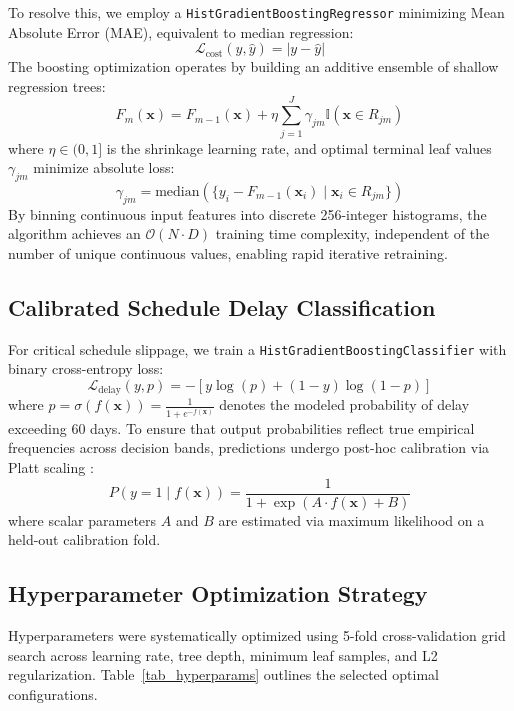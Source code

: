 \documentclass[conference]{IEEEtran}
\begin{document}
To resolve this, we employ a \texttt{HistGradientBoostingRegressor} minimizing Mean Absolute Error (MAE), equivalent to median regression:
\begin{equation}
\mathcal{L}_{\text{cost}}(y, \hat{y}) = |y - \hat{y}|
\end{equation}
The boosting optimization operates by building an additive ensemble of shallow regression trees:
\begin{equation}
F_m(\mathbf{x}) = F_{m-1}(\mathbf{x}) + \eta \sum_{j=1}^{J} \gamma_{jm} \mathbb{I}(\mathbf{x} \in R_{jm})
\end{equation}
where $\eta \in (0, 1]$ is the shrinkage learning rate, and optimal terminal leaf values $\gamma_{jm}$ minimize absolute loss:
\begin{equation}
\gamma_{jm} = \text{median}\left( \{ y_i - F_{m-1}(\mathbf{x}_i) \mid \mathbf{x}_i \in R_{jm} \} \right)
\end{equation}
By binning continuous input features into discrete 256-integer histograms, the algorithm achieves an $\mathcal{O}(N \cdot D)$ training time complexity, independent of the number of unique continuous values, enabling rapid iterative retraining.

\subsection{Calibrated Schedule Delay Classification}
For critical schedule slippage, we train a \texttt{HistGradientBoostingClassifier} with binary cross-entropy loss:
\begin{equation}
\mathcal{L}_{\text{delay}}(y, p) = - \left[ y \log(p) + (1 - y) \log(1 - p) \right]
\end{equation}
where $p = \sigma(f(\mathbf{x})) = \frac{1}{1 + e^{-f(\mathbf{x})}}$ denotes the modeled probability of delay exceeding 60 days. To ensure that output probabilities reflect true empirical frequencies across decision bands, predictions undergo post-hoc calibration via Platt scaling \cite{b17}:
\begin{equation}
P(y = 1 \mid f(\mathbf{x})) = \frac{1}{1 + \exp(A \cdot f(\mathbf{x}) + B)}
\end{equation}
where scalar parameters $A$ and $B$ are estimated via maximum likelihood on a held-out calibration fold.

\subsection{Hyperparameter Optimization Strategy}
Hyperparameters were systematically optimized using 5-fold cross-validation grid search across learning rate, tree depth, minimum leaf samples, and L2 regularization. Table~\ref{tab_hyperparams} outlines the selected optimal configurations.
\end{document}
